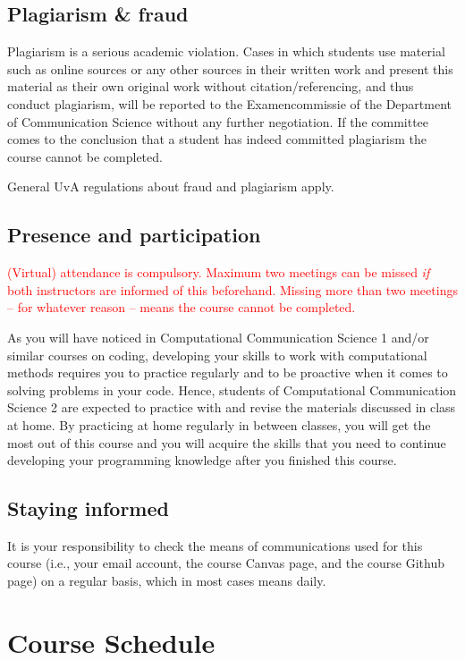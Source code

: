 \documentclass[a4paper,10pt,twocolumn]{report}
\begin{document}
	\section{Plagiarism \& fraud}
	Plagiarism is a serious academic violation. Cases in which students use material such as online sources or any other sources in their written work and present this material as their own original work without citation/referencing, and thus conduct plagiarism, will be reported to the Examencommissie of the Department of Communication Science without any further negotiation. If the committee comes to the conclusion that a student has indeed committed plagiarism the course cannot be completed. 

	General UvA regulations about fraud and plagiarism apply.

	\section{Presence and participation}
	\textcolor{red}{(Virtual) attendance is compulsory. Maximum two meetings can be missed \emph{if} both instructors are informed of this beforehand. Missing more than two meetings – for whatever reason – means the course cannot be completed.} 
	
	As you will have noticed in Computational Communication Science 1 and/or similar courses on coding, developing your skills to work with computational methods requires you to practice regularly and to be proactive when it comes to solving problems in your code. Hence, students of Computational Communication Science 2 are expected to practice with and revise the materials discussed in class at home. By practicing at home regularly in between classes, you will get the most out of this course and you will acquire the skills that you need to continue developing your programming knowledge after you finished this course.
	
	\section{Staying informed}
	It is your responsibility to check the means of communications used for this course (i.e., your email account, the course Canvas page, and the course Github page) on a regular basis, which in most cases means daily.
	
	

	

	
	
	\chapter{Course Schedule}
	
	
	
	
	
	
	
	
\end{document}
